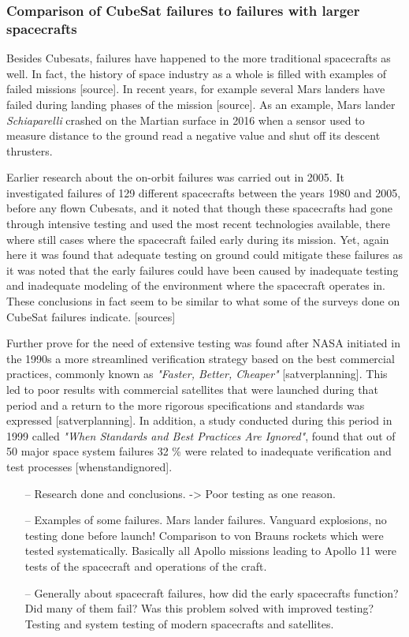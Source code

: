 \documentclass[english,12pt,a4paper,pdftex,elec,utf8]{aaltothesis}
\begin{document}
\subsubsection{Comparison of CubeSat failures to failures with larger spacecrafts}
Besides Cubesats, failures have happened to the more traditional spacecrafts as well. In fact, the history of space industry as a whole is filled with examples of failed missions [source]. In recent years, for example several Mars landers have failed during landing phases of the mission [source]. As an example, Mars lander \textit{Schiaparelli} crashed on the Martian surface in 2016 when a sensor used to measure distance to the ground read a negative value and shut off its descent thrusters.\par
Earlier research about the on-orbit failures was carried out in 2005. It investigated failures of 129 different spacecrafts between the years 1980 and 2005, before any flown Cubesats, and it noted that though these spacecrafts had gone through intensive testing and used the most recent technologies available, there where still cases where the spacecraft failed early during its mission. Yet, again here it was found that adequate testing on ground could mitigate these failures as it was noted that the early failures could have been caused by inadequate testing and inadequate modeling of the environment where the spacecraft operates in. These conclusions in fact seem to be similar to what some of the surveys done on CubeSat failures indicate. [sources]\par
Further prove for the need of extensive testing was found after NASA initiated in the 1990s a more streamlined verification strategy based on the best commercial practices, commonly known as \textit{"Faster, Better, Cheaper"} [satverplanning]. This led to poor results with commercial satellites that were launched during that period and a return to the more rigorous specifications and standards was expressed [satverplanning]. In addition, a study conducted during this period in 1999 called \textit{"When Standards and Best Practices Are Ignored"}, found that out of 50 major space system failures 32 \% were related to inadequate verification and test processes [whenstandignored]. 
\begin{itemize}
\item[--]Research done and conclusions. -> Poor testing as one reason.
\item[--]Examples of some failures. Mars lander failures. Vanguard explosions, no testing done before launch! Comparison to von Brauns rockets which were tested systematically. Basically all Apollo missions leading to Apollo 11 were tests of the spacecraft and operations of the craft.
\item[--]Generally about spacecraft failures, how did the early spacecrafts function? Did many of them fail? Was this problem solved with improved testing? Testing and system testing of modern spacecrafts and satellites.
\end{itemize}
\end{document}
